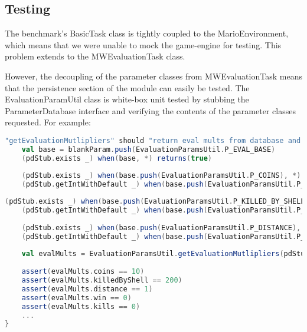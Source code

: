 
\subsection{Testing}
\label{subsec:lptest}

The benchmark's BasicTask class is tightly coupled to the MarioEnvironment, which means that we were unable to mock the game-engine for testing. This problem extends to the MWEvaluationTask class.

However, the decoupling of the parameter classes from MWEvaluationTask means that the persistence section of the module can easily be tested. The EvaluationParamUtil class is white-box unit tested by stubbing the ParameterDatabase interface and verifying the contents of the parameter classes requested. For example:

\begin{minipage}{0.9\linewidth}
\centering
\begin{lstlisting}[language=scala]
"getEvaluationMutlipliers" should "return eval mults from database and zero otherwise" in {
    val base = blankParam.push(EvaluationParamsUtil.P_EVAL_BASE)
    (pdStub.exists _) when(base, *) returns(true)
 
    (pdStub.exists _) when(base.push(EvaluationParamsUtil.P_COINS), *) returns(true)
    (pdStub.getIntWithDefault _) when(base.push(EvaluationParamsUtil.P_COINS), *, *) returns(10)
\end{lstlisting}
\end{minipage}     
    
\begin{minipage}{0.9\linewidth}
\centering
\begin{lstlisting}[language=scala]      
    (pdStub.exists _) when(base.push(EvaluationParamsUtil.P_KILLED_BY_SHELL), *) returns(true)
    (pdStub.getIntWithDefault _) when(base.push(EvaluationParamsUtil.P_KILLED_BY_SHELL), *, *) returns(200)
     
    (pdStub.exists _) when(base.push(EvaluationParamsUtil.P_DISTANCE), *) returns(true)
    (pdStub.getIntWithDefault _) when(base.push(EvaluationParamsUtil.P_DISTANCE), *, *) returns(1)
    
    val evalMults = EvaluationParamsUtil.getEvaluationMutlipliers(pdStub, base);
    
    assert(evalMults.coins == 10)
    assert(evalMults.killedByShell == 200)
    assert(evalMults.distance == 1)
    assert(evalMults.win == 0)
    assert(evalMults.kills == 0)
    ...
}

\end{lstlisting}
\end{minipage}


